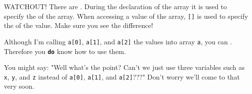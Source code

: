 WATCHOUT! There are . During the declaration of the array it is used to specify the  of the array. When accessing a value of the array, \texttt{[]} is used to specify the  of the value. Make sure you see the difference!

Although I'm calling \texttt{a[0]}, \texttt{a[1]}, and \texttt{a[2]} the values into array \texttt{a}, you can . Therefore you \texttt\textbf{do} know how to use them.

You might say: "Well what's the point? Can't we just use three variables such as \texttt{x}, \texttt{y}, and \texttt{z} instead of \texttt{a[0]}, \texttt{a[1]}, and \texttt{a[2]}???" Don't worry we'll come to that very soon.



